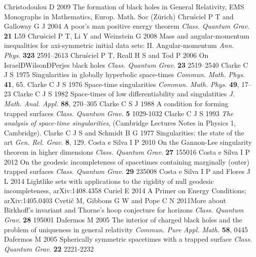 \documentclass[12pt]{iopart}
\begin{document}
\begin{thebibliography}{999}
 Christodoulou D 2009 The formation of black holes in General Relativity, EMS Monographs in Mathematics, Europ. Math. Soc (Z\"urich)
 Chru\'{s}ciel P T and Galloway G J 2004 A poor's man positive energy theorem {\it Class. Quantum Grav.} {\bf 21} L59
 Chru\'{s}ciel P T, Li Y and Weinstein G 2008 Mass and angular-momentum inequalities for axi-symmetric initial data sets: II. Angular-momentum {\it Ann. Phys.} {\bf 323} 2591--2613
 Chru\'{s}ciel P T, Reall H S and Tod P 2006 On IsraelÐWilsonÐPerjes black holes {\it Class. Quantum Grav.} {\bf 23} 2519--2540
 Clarke C J S 1975 Singularities in globally hyperbolic space-times  {\it Commun. Math. Phys.} {\bf 41},
65.%
 Clarke C J S 1976 Space-time singularities {\it Commun. Math. Phys.} {\bf 49},
17--23%
 Clarke C J S 1982 Space-times of low differentiability and singulatities {\it J. Math. Anal. Appl.} {\bf 88},
270--305%
 Clarke C S J 1988 A condition for forming trapped surfaces {\it Class. Quantum Grav.} {\bf 5} 1029-1032
 Clarke C J S 1993 {\it The analysis of space-time
singularities}, (Cambridge Lectures Notes in Physics 1, Cambridge).
 Clarke C J S and Schmidt B G 1977 Singularities: the state of the art {\it Gen. Rel. Grav.} {\bf 8},
129.%
 Costa e Silva I P 2010 On the Gannon-Lee singularity theorem in higher dimensions {\it Class. Quantum Grav.} {\bf 27} 155016%
 Costa e Silva I P 2012 On the geodesic incompleteness of spacetimes containing marginally (outer) trapped surfaces {\it Class. Quantum Grav.} {\bf 29} 235008
 Costa e Silva I P and Flores J L 2014 Lightlike sets with applications to the rigidity of null geodesic incompleteness,  arXiv:1408.4358
 Curiel E 2014 A Primer on Energy Conditions;  arXiv:1405.0403
 Cveti\v{c} M, Gibbons G W and  Pope C N 2011More about Birkhoff's invariant and Thorne's hoop conjecture for horizons {\it Class. Quantum Grav.} {\bf 28} 195001
 Dafermos M 2005 The interior of charged black holes and the problem of uniqueness in general relativity {\it Commun. Pure Appl. Math.} {\bf 58}, 0445
 Dafermos M 2005 Spherically symmetric spacetimes with a trapped surface {\it Class. Quantum Grav.} {\bf 22} 2221-2232

\end{thebibliography}
\end{document}
